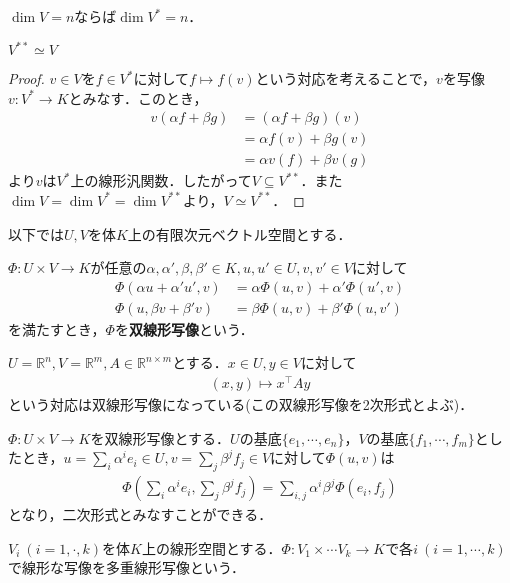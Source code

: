 \documentclass[uplatex]{jsarticle}
\begin{document}
\begin{corr}
  $\dim V = n$ならば$\dim V^\ast = n$．
\end{corr}
\begin{prop}
  $V^{\ast \ast} \simeq V$
\end{prop}
\begin{proof}
  $v\in V$を$f\in V^\ast$に対して$f\mapsto f(v)$という対応を考えることで，$v$を写像$v\colon V^\ast \to K$とみなす．このとき，
  \begin{align*}
    v(\alpha f + \beta g) & = (\alpha f + \beta g)(v) \\
    & = \alpha f(v) + \beta g(v) \\
    & = \alpha v(f) + \beta v(g)
  \end{align*}
  より$v$は$V^\ast$上の線形汎関数．したがって$V\subseteq V^{\ast \ast}$．また$\dim V = \dim V^\ast = \dim V^{\ast \ast}$より，$V \simeq V^{\ast \ast}$．
\end{proof}

\sukima{}

以下では$U,V$を体$K$上の有限次元ベクトル空間とする．
\begin{teigi}[双線形写像]
  $\Phi\colon U\times V\to K$が任意の$\alpha,\alpha',\beta,\beta'\in K,u,u'\in U ,v,v'\in V$に対して
  \begin{align*}
    \Phi(\alpha u + \alpha' u',v) & = \alpha \Phi(u,v) + \alpha' \Phi(u',v) \\
    \Phi(u,\beta v + \beta' v) & = \beta \Phi(u,v) + \beta' \Phi(u,v') 
  \end{align*}
  を満たすとき，$\Phi$を\textbf{双線形写像}という．
\end{teigi}

\begin{rei}
  $U = \mathbb{R}^n , V = \mathbb{R}^m, A \in \mathbb{R}^{n\times m}$とする．$x \in U , y \in V$に対して
  \begin{align*}
    (x,y) \mapsto x^\top A y
  \end{align*}
  という対応は双線形写像になっている(この双線形写像を2次形式とよぶ)．
\end{rei}
\begin{remark}
  $\Phi\colon U\times V\to K$を双線形写像とする．$U$の基底$\{e_1,\cdots,e_n\}$，$V$の基底$\{f_1,\cdots,f_m\}$としたとき，$u = \sum_{i} \alpha^i e_i \in U , v = \sum_j \beta^j  f_j \in V$に対して$\Phi(u,v)$は
  \begin{align*}
    \Phi\left(\sum_{i} \alpha^i e_i,\sum_j \beta^j f_j\right) = \sum_{i,j} \alpha^i \beta^j \Phi(e_i,f_j)
  \end{align*}
  となり，二次形式とみなすことができる．
\end{remark}
\begin{teigi}[多重線形写像]
  $V_i\ (i=1,\cdot,k)$を体$K$上の線形空間とする．$\Phi\colon V_1\times \cdots V_k \to K$で各$i\  ( i=1,\cdots,k)$で線形な写像を多重線形写像という．
\end{teigi}
\end{document}
